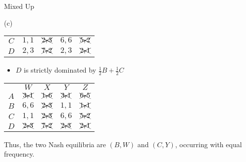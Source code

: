 \documentclass[8pt]{extarticle}
\begin{document}
\begin{problem}{Mixed Up}
\begin{problem}{(c)}
\begin{center}
\begin{tabular}{c|c|c|c|c|}
          \cline{2-5}
          $C$ & $1,1$ & $\xcancel{2,3}$ & $6,6$ & $\xcancel{5,2}$ \\
          \cline{2-5}
          $D$ & $2,3$ & $\xcancel{7,2}$ & $2,3$ & $\xcancel{2,1}$\\
          \cline{2-5}
        \end{tabular}
      \end{center}
      \begin{itemize}
        \item $D$ is strictly dominated by $\frac{1}{2}B + \frac{1}{2}C$
      \end{itemize}
      \begin{center}
        \renewcommand{\arraystretch}{1.5}
        \begin{tabular}{c|c|c|c|c|}
          \multicolumn{1}{c}{} & \multicolumn{1}{c}{$W$} & \multicolumn{1}{c}{$X$} & \multicolumn{1}{c}{$Y$} & \multicolumn{1}{c}{$Z$}\\
          \cline{2-5}
          $A$ & $\xcancel{3,1}$ & $\xcancel{1,6}$ & $\xcancel{3,1}$ & $\xcancel{6,5}$ \\
          \cline{2-5}
          $B$ & $6,6$ & $\xcancel{2,3}$ & $1,1$ & $\xcancel{1,1}$ \\
          \cline{2-5}
          $C$ & $1,1$ & $\xcancel{2,3}$ & $6,6$ & $\xcancel{5,2}$ \\
          \cline{2-5}
          $D$ & $\xcancel{2,3}$ & $\xcancel{7,2}$ & $\xcancel{2,3}$ & $\xcancel{2,1}$\\
          \cline{2-5}
        \end{tabular}
      \end{center}
      Thus, the two Nash equilibria are $(B,W)$ and $(C,Y)$, occurring with equal frequency.
    \end{problem}
  \end{problem}
\end{document}
